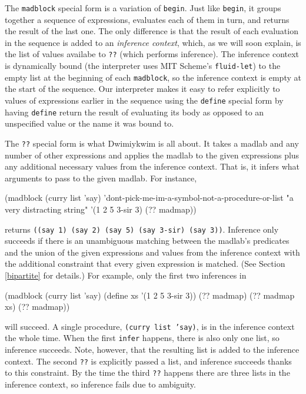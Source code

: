 \documentclass[11pt]{article}
\begin{document}
The \texttt{madblock} special form is a variation of \texttt{begin}.
Just like \texttt{begin},
it groups together a sequence of expressions,
evaluates each of them in turn,
and returns the result of the last one.
The only difference is that the result of each evaluation in the sequence
is added to an \emph{inference context},
which, as we will soon explain,
is the list of values availabe to \texttt{??}
(which performs inference).
The inference context is dynamically bound
(the interpreter uses MIT Scheme's \texttt{fluid-let})
to the empty list at the beginning of each \texttt{madblock},
so the inference context is empty at the start of the sequence.
Our interpreter makes it easy to refer explicitly
to values of expressions earlier in the sequence
using the \texttt{define} special form
by having \texttt{define} return the result of evaluating its body
as opposed to an unspecified value or the name it was bound to.

The \texttt{??} special form is what Dwimiykwim is all about.
It takes a madlab and any number of other expressions
and applies the madlab to the given expressions
plus any additional necessary values from the inference context.
That is, it infers what arguments to pass to the given madlab.
For instance,
\begin{verbbox}
(madblock
 (curry list 'say)
 'dont-pick-me-im-a-symbol-not-a-procedure-or-list
 "a very distracting string"
 '(1 2 5 3-sir 3)
 (?? madmap))
\end{verbbox}
\begin{center}\theverbbox\end{center}
returns \texttt{((say 1) (say 2) (say 5) (say 3-sir) (say 3))}.
Inference only succeeds if there is an unambiguous matching
between the madlab's predicates and the union of the given expressions
and values from the inference context
with the additional constraint that every given expression is matched.
(See Section \ref{bipartite} for details.)
For example, only the first two inferences in
\begin{verbbox}
(madblock
 (curry list 'say)
 (define xs '(1 2 5 3-sir 3))
 (?? madmap)
 (?? madmap xs)
 (?? madmap))
\end{verbbox}
\begin{center}\theverbbox\end{center}
will succeed.
A single procedure, \texttt{(curry list 'say)},
is in the inference context the whole time.
When the first \texttt{infer} happens,
there is also only one list, so inference succeeds.
Note, however, that the resulting list is added to the inference context.
The second \texttt{??} is explicitly passed a list,
and inference succeeds thanks to this constraint.
By the time the third \texttt{??} happens
there are three lists in the inference context,
so inference fails due to ambiguity.
\end{document}
